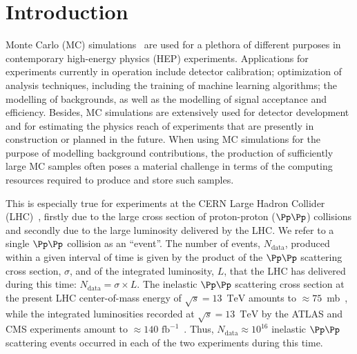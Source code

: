 \documentclass[twocolumn,epjc3]{svjour3}
\newcommand{\TeV}{\ensuremath{\textrm{TeV}}\xspace}
\newcommand{\data}{\ensuremath{\textrm{data}}\xspace}
\newcommand{\fbinv}{\ensuremath{\textrm{~fb}^{-1}}\xspace}
\begin{document}
\section{Introduction}
\label{sec:introduction}

Monte Carlo (MC) simulations~\cite{Kroese2014WhyTM,dunn2011exploring} are used for a plethora of different purposes in contemporary high-energy physics (HEP) experiments.
Applications for experiments currently in operation include detector calibration; optimization of analysis techniques, including the training of machine learning algorithms;
the modelling of backgrounds, as well as the modelling of signal acceptance and efficiency.
Besides, MC simulations are extensively used for detector development and for estimating the physics reach of experiments that are presently in construction or planned in the future.
When using MC simulations for the purpose of modelling background contributions,
the production of sufficiently large MC samples often poses a material challenge in terms of the computing resources required to produce and store such samples.

This is especially true for experiments at the CERN Large Hadron Collider (LHC)~\cite{Bruning:2004ej,Buning:2004wk,Benedikt:2004wm},
firstly due to the large cross section of proton-proton ($\Pp\Pp$) collisions and secondly due to the large luminosity delivered by the LHC.
We refer to a single $\Pp\Pp$ collision as an ``event''.
The number of events, $N_{\data}$, produced within a given interval of time 
is given by the product of the $\Pp\Pp$ scattering cross section, $\sigma$, and of the integrated luminosity, $L$, that the LHC has delivered during this time:
$N_{\data} = \sigma \times L$.
The inelastic $\Pp\Pp$ scattering cross section at the present LHC center-of-mass energy of $\sqrt{s}=13$~\TeV amounts to $\approx 75$~mb~\cite{Aaboud:2016mmw,Sirunyan:2018nqx},
while the integrated luminosities recorded at $\sqrt{s}=13$~\TeV by the ATLAS and CMS experiments amount to $\approx 140\fbinv$~\cite{ATLAS-CONF-2019-021,LUM-17-001,LUM-17-004,LUM-18-002}.
Thus, $N_{\data} \approx 10^{16}$ inelastic $\Pp\Pp$ scattering events occurred in each of the two experiments during this time.
\end{document}
